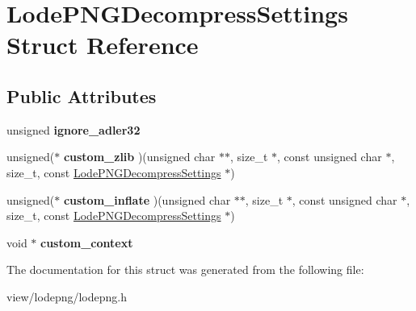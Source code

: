 \hypertarget{struct_lode_p_n_g_decompress_settings}{\section{Lode\-P\-N\-G\-Decompress\-Settings Struct Reference}
\label{struct_lode_p_n_g_decompress_settings}
}
\subsection*{Public Attributes}
\begin{DoxyCompactItemize}
\item 
\hypertarget{struct_lode_p_n_g_decompress_settings_afab4b919650b51b4d2f175a60ed6c580}{unsigned {\bfseries ignore\-\_\-adler32}}\label{struct_lode_p_n_g_decompress_settings_afab4b919650b51b4d2f175a60ed6c580}

\item 
\hypertarget{struct_lode_p_n_g_decompress_settings_abc40604f104a1b2f6d64359c692c09e8}{unsigned($\ast$ {\bfseries custom\-\_\-zlib} )(unsigned char $\ast$$\ast$, size\-\_\-t $\ast$, const unsigned char $\ast$, size\-\_\-t, const \hyperlink{struct_lode_p_n_g_decompress_settings}{Lode\-P\-N\-G\-Decompress\-Settings} $\ast$)}\label{struct_lode_p_n_g_decompress_settings_abc40604f104a1b2f6d64359c692c09e8}

\item 
\hypertarget{struct_lode_p_n_g_decompress_settings_a6e3d0cc225a66bba82a5b6ef9209b515}{unsigned($\ast$ {\bfseries custom\-\_\-inflate} )(unsigned char $\ast$$\ast$, size\-\_\-t $\ast$, const unsigned char $\ast$, size\-\_\-t, const \hyperlink{struct_lode_p_n_g_decompress_settings}{Lode\-P\-N\-G\-Decompress\-Settings} $\ast$)}\label{struct_lode_p_n_g_decompress_settings_a6e3d0cc225a66bba82a5b6ef9209b515}

\item 
\hypertarget{struct_lode_p_n_g_decompress_settings_aa8d507077609be70ab1f260f04167d91}{void $\ast$ {\bfseries custom\-\_\-context}}\label{struct_lode_p_n_g_decompress_settings_aa8d507077609be70ab1f260f04167d91}

\end{DoxyCompactItemize}


The documentation for this struct was generated from the following file\-:\begin{DoxyCompactItemize}
\item 
view/lodepng/lodepng.\-h\end{DoxyCompactItemize}
